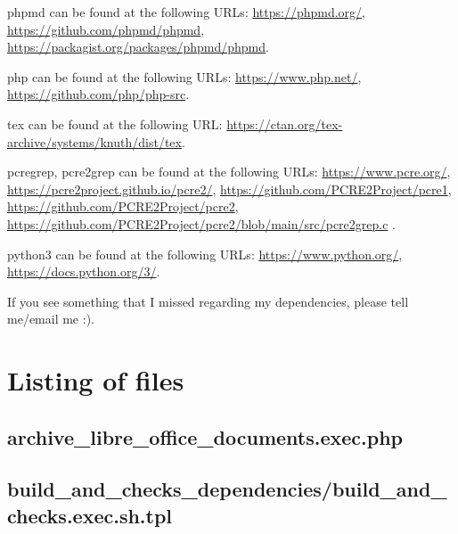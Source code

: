 \documentclass{article}
\begin{document}
phpmd can be found at the following URLs:\newline
\url{https://phpmd.org/},\newline
\url{https://github.com/phpmd/phpmd},\newline
\url{https://packagist.org/packages/phpmd/phpmd}.

php can be found at the following URLs:\newline
\url{https://www.php.net/},\newline
\url{https://github.com/php/php-src}.

tex can be found at the following URL:\newline
\url{https://ctan.org/tex-archive/systems/knuth/dist/tex}.

pcregrep, pcre2grep can be found at the following URLs:\newline
\url{https://www.pcre.org/},\newline
\url{https://pcre2project.github.io/pcre2/},\newline
\url{https://github.com/PCRE2Project/pcre1},\newline
\url{https://github.com/PCRE2Project/pcre2},\newline
{\small
  \url{https://github.com/PCRE2Project/pcre2/blob/main/src/pcre2grep.c}
}.

python3 can be found at the following URLs:\newline
\url{https://www.python.org/},\newline
\url{https://docs.python.org/3/}.

If you see something that I missed regarding my dependencies,
please tell me/email me :).

\section{Listing of files}
\label{section:listing}

\subsection{
  archive\_libre\_office\_documents.exec.php
}
\label{
  archive_libre_office_documentsexecphp
}



\subsection{
  build\_and\_checks\_dependencies/build\_and\_checks.exec.sh.tpl
}
\label{
  build_and_checks_dependencies:build_and_checksexecshtpl
}
\end{document}
